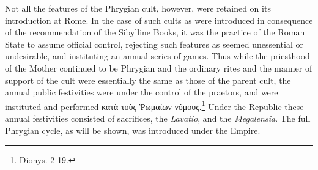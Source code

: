 \documentclass[a4paper, 11pt, oneside, polutonikogreek, english]{article}
\begin{document}
Not all the features of the Phrygian cult, however, were retained on its introduction at Rome. In the case of such cults as were introduced in consequence of the recommendation of the Sibylline Books, it was the practice of the Roman State to assume official control, rejecting such features as seemed unessential or undesirable, and instituting an annual series of games. Thus while the priesthood of the Mother continued to be Phrygian and the ordinary rites and the manner of support of the cult were essentially the same as those of the parent cult, the annual public festivities were under the control of the praetors, and were instituted and performed κατὰ τοὺς Ῥωμαίων νόμους.\footnote{Dionys. 2 19.} Under the Republic these annual festivities consisted of sacrifices, the \emph{Lavatio}, and the \emph{Megalensia}. The full Phrygian cycle, as will be shown, was introduced under the Empire.
\end{document}
